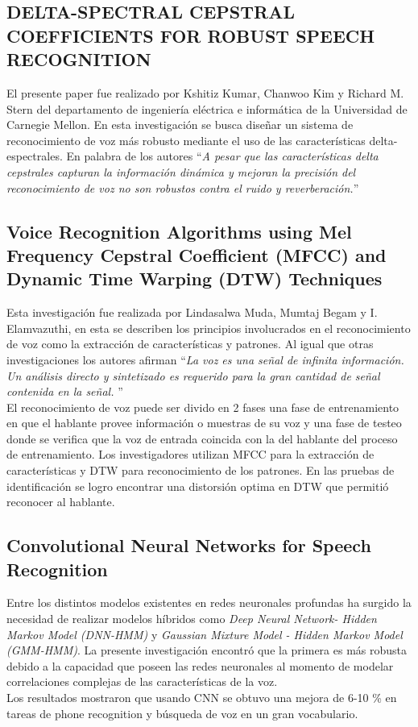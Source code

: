 \subsection{DELTA-SPECTRAL CEPSTRAL COEFFICIENTS FOR ROBUST SPEECH RECOGNITION}

El presente paper fue realizado por Kshitiz Kumar, Chanwoo Kim y Richard M. Stern del departamento de ingeniería eléctrica e informática de la Universidad de Carnegie Mellon. En esta investigación se busca diseñar un sistema de reconocimiento de voz más robusto mediante el uso de las características delta-espectrales. En palabra de los autores \textquotedblleft \textit{A pesar que las características delta cepstrales capturan la información dinámica y mejoran la precisión del reconocimiento de voz no son robustos contra el ruido y reverberación.}\textquotedblright

\subsection{Voice Recognition Algorithms using Mel Frequency Cepstral Coefficient (MFCC) and Dynamic Time Warping (DTW) Techniques
}
Esta investigación fue realizada por Lindasalwa Muda, Mumtaj Begam y I. Elamvazuthi, en esta se describen los principios involucrados en el reconocimiento de voz como la extracción de características y patrones. Al igual que otras investigaciones los autores afirman \textquotedblleft \textit{La voz es una señal de infinita información. Un análisis directo y sintetizado es requerido para la gran cantidad de señal contenida en la señal.} \textquotedblright \\ El reconocimiento de voz puede ser divido en 2 fases una fase de entrenamiento en que el hablante provee información o muestras de su voz y una fase de testeo donde se verifica que la voz de entrada coincida con la del hablante del proceso de entrenamiento.	Los investigadores utilizan MFCC para la extracción de características y DTW para reconocimiento de los patrones. En las pruebas de identificación se logro encontrar una distorsión optima en DTW que permitió reconocer al hablante.
\subsection{Convolutional Neural Networks for Speech Recognition}
Entre los distintos modelos existentes en redes neuronales profundas ha surgido la necesidad de realizar modelos híbridos como \textit{Deep Neural Network- Hidden Markov Model (DNN-HMM)} y \textit{Gaussian Mixture Model - Hidden Markov Model (GMM-HMM)}. La presente investigación encontró que la primera es más robusta debido a la capacidad que poseen las redes neuronales al momento de modelar correlaciones complejas de las características de la voz.\\ Los resultados mostraron que usando CNN se obtuvo una mejora de 6-10 \% en tareas de phone recognition y búsqueda de voz en un gran vocabulario.
